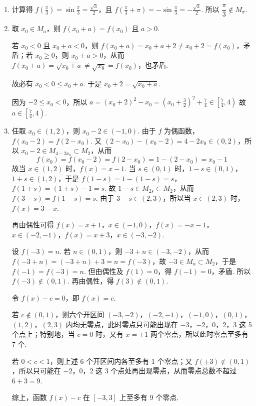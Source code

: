 \begin{solution}
\begin{enumerate}
\item 计算得 \(f\left(\frac{\pi}{3}\right)=\sin\frac{\pi}{3}=\frac{\sqrt{3}}{2}\)，且 \(f\left(\frac{\pi}{3}+\pi\right)=-\sin\frac{\pi}{3}=-\frac{\sqrt{3}}{2}\). 所以 \(\dfrac{\pi}{3}\notin M_{\pi}\).

\item 取 \(x_0\in M_a\)，则 \(f(x_0+a)=f(x_0)\) 且 \(a>0\).

若 \(x_0<0\) 且 \(x_0+a<0\)，则 \(f(x_0+a)=x_0+a+2\ne x_0+2=f(x_0)\)，矛盾；若 \(x_0\ge0\)，则 \(x_0+a>0\)，从而 \(f(x_0+a)=\sqrt{x_0+a}\ne\sqrt{x_0}=f(x_0)\)，也矛盾.

故必有 \(x_0<0\le x_0+a\). 于是 \(x_0+2=\sqrt{x_0+a}\).

因为 \(-2\le x_0<0\)，所以
\(
a=(x_0+2)^2-x_0=\left(x_0+\frac{3}{2}\right)^2+\frac{7}{4}\in\left[\frac{7}{4},4\right)
\)
故 \(a\in\left[\frac{7}{4},4\right)\).

\item 任取 \(x_0\in(1,2)\)，则 \(x_0-2\in(-1,0)\). 由于 \(f\) 为偶函数，\(f(x_0-2)=f(2-x_0)\). 又 \((2-x_0)-(x_0-2)=4-2x_0\in(0,2)\)，所以 \(x_0-2\in M_{4-2x_0}\subset M_2\)，从而
\[
f(x_0)=f(x_0-2)=f(2-x_0)=1-(2-x_0)=x_0-1
\]
故当 \(x\in(1,2)\) 时，\(f(x)=x-1\).
当 \(s\in(0,1)\) 时，\(1-s\in(0,1)\)，\(1+s\in(1,2)\)，于是 \(f(1-s)=1-(1-s)=s\)，\(f(1+s)=(1+s)-1=s\). 故 \(1-s\in M_{2s}\subset M_2\)，从而 \(f(3-s)=f(1-s)=s\). 由于 \(3-s\in(2,3)\)，所以当 \(x\in(2,3)\) 时，\(f(x)=3-x\).

再由偶性可得
\(f(x)=x+1\)，\(x\in(-1,0)\)，\(f(x)=-x-1\)，\(x\in(-2,-1)\)，\(f(x)=x+3\)，\(x\in(-3,-2)\).

设 \(f(-3)=n\). 若 \(n\in(0,1)\)，则 \(-3+n\in(-3,-2)\)，从而 \(f(-3+n)=(-3+n)+3=n=f(-3)\)，故 \(-3\in M_n\subset M_2\)，于是 \(f(-1)=f(-3)=n\).
但由偶性及 \(f(1)=0\)，得 \(f(-1)=0\)，矛盾. 所以 \(f(-3)\notin(0,1)\). 再由偶性，得 \(f(3)\notin(0,1)\).

令 \(f(x)-c=0\)，即 \(f(x)=c\).

若 \(c\notin(0,1)\)，则六个开区间
\((-3,-2)\)，\((-2,-1)\)，\((-1,0)\)，\((0,1)\)，\((1,2)\)，\((2,3)\)
内均无零点，此时零点只可能出现在 \(-3\)，\(-2\)，\(0\)，\(2\)，\(3\) 这 5 个点上；特别地，当 \(c=0\) 时，又有 \(x=\pm1\) 两个零点，所以此时零点至多有 7 个.

若 \(0<c<1\)，则上述 6 个开区间内各至多有 1 个零点；又 \(f(\pm3)\notin(0,1)\)，所以只可能在 \(-2\)，\(0\)，\(2\) 这 3 个点处再出现零点，从而零点总数不超过 \(6+3=9\).

综上，函数 \(f(x)-c\) 在 \([-3,3]\) 上至多有 9 个零点.
\end{enumerate}
\end{solution}
